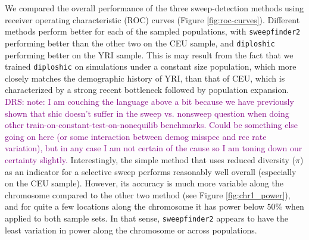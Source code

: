 \documentclass[hidelinks]{article}
\newcommand{\sweepfinder}{\texttt{sweepfinder2}\xspace}
\newcommand{\diploshic}{\texttt{diploshic}\xspace}
\newcommand{\drscomment}[1]{\textcolor{purple}{DRS: #1}}
\begin{document}
    We compared the overall performance of the three sweep-detection methods using
    receiver operating characteristic (ROC) curves (Figure \ref{fig:roc-curves}).
    Different methods perform better for each of the sampled populations,
    with \sweepfinder performing better than the other two on the CEU sample,
    and \diploshic performing better on the YRI sample.
    This is may result from the fact that we trained \diploshic on simulations under a constant size population,
    which more closely matches the demographic history of YRI, than that of CEU, which 
    is characterized by a strong recent bottleneck followed by population expansion.
    \drscomment{note: I am couching the language above a bit because we have previously shown that shic doesn't suffer in the sweep vs. nonsweep question when doing other train-on-constant-test-on-nonequilib benchmarks. Could be something else going on here (or some interaction between demog misspec and rec rate variation), but in any case I am not certain of the cause so I am toning down our certainty slightly.}
    Interestingly, the simple method that uses reduced diversity ($\pi$) as an indicator
    for a selective sweep performs reasonably well overall (especially on the CEU sample).
    However, its accuracy is much more variable along the chromosome compared to the other two method (see Figure \ref{fig:chr1_power}),
    and for quite a few locations along the chromosome it has power below $50\%$
    when applied to both sample sets.
    In that sense, \sweepfinder appears to have the least variation in power along the chromosome or across populations.
\end{document}
